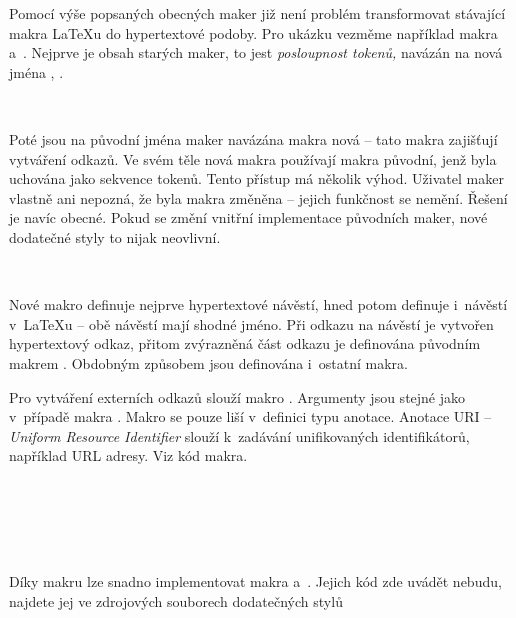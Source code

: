 \documentclass[12pt]{article}
\begin{document}
\medskip
Pomocí výše popsaných obecných maker již není problém transformovat stávající
makra \LaTeX u do hypertextové podoby. Pro ukázku vezměme například makra 
 a~. Nejprve je obsah starých maker, to jest
\emph{posloupnost tokenů,}
navázán na nová jména , 
.
\begin{flushleft}
   \\
\end{flushleft}
Poté jsou na původní jména maker navázána makra nová -- tato makra zajišťují
vytváření odkazů. Ve svém těle nová makra používají makra původní, jenž byla
uchována jako sekvence tokenů. Tento přístup má několik výhod. Uživatel maker
vlastně ani nepozná, že byla makra změněna -- jejich funkčnost se nemění.
Řešení je navíc obecné. Pokud se změní vnitřní implementace původních maker,
nové dodatečné styly to nijak neovlivní.
\begin{flushleft}
   \\
\end{flushleft}
Nové makro  definuje nejprve hypertextové návěstí, hned potom 
definuje i~návěstí v~\LaTeX u -- obě návěstí mají shodné jméno. Při odkazu
na návěstí je vytvořen hypertextový odkaz, přitom zvýrazněná část odkazu je
definována původním makrem . Obdobným způsobem jsou definována 
i~ostatní makra.

\medskip
Pro vytváření externích odkazů slouží makro . Argumenty jsou
stejné jako v~případě makra . Makro se pouze liší 
v~definici typu anotace. Anotace URI -- \emph{Uniform Resource Identifier}
slouží k~zadávání unifikovaných identifikátorů, například URL adresy.
Viz kód makra.
\begin{flushleft}
   \\
   \\
   \\
   \\
\end{flushleft}
Díky makru  lze snadno implementovat makra 
a~. Jejich kód zde uvádět nebudu, najdete jej ve zdrojových souborech
dodatečných stylů
\end{document}
